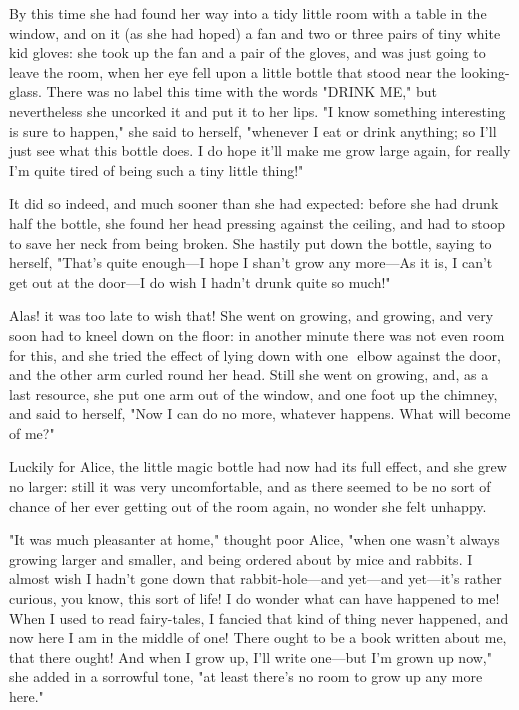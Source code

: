 By this time she had found her way into a tidy little room with a table in the window, and on it (as she had hoped) a fan and two or three pairs of tiny white kid gloves: she took up the fan and a pair of the gloves, and was just going to leave the room, when her eye fell upon a little bottle that stood near the looking-glass. There was no label this time with the ​words "DRINK ME," but nevertheless she uncorked it and put it to her lips. "I know something interesting is sure to happen," she said to herself, "whenever I eat or drink anything; so I'll just see what this bottle does. I do hope it'll make me grow large again, for really I'm quite tired of being such a tiny little thing!"

It did so indeed, and much sooner than she had expected: before she had drunk half the bottle, she found her head pressing against the ceiling, and had to stoop to save her neck from being broken. She hastily put down the bottle, saying to herself, "That's quite enough—I hope I shan't grow any more—As it is, I can't get out at the door—I do wish I hadn't drunk quite so much!"

Alas! it was too late to wish that! She went on growing, and growing, and very soon had to kneel down on the floor: in another minute there was not even room for this, and she tried the effect of lying down with one ​
elbow against the door, and the other arm curled round her head. Still she went on growing, and, as a last resource, she put one arm out of the window, and one foot up the chimney, and said to herself, "Now I can do no more, whatever happens. What will become of me?"

Luckily for Alice, the little magic bottle had now had its full effect, and she grew no larger: still it was very uncomfortable, and as there seemed to be no sort of chance of her ever ​getting out of the room again, no wonder she felt unhappy.

"It was much pleasanter at home," thought poor Alice, "when one wasn't always growing larger and smaller, and being ordered about by mice and rabbits. I almost wish I hadn't gone down that rabbit-hole—and yet—and yet—it's rather curious, you know, this sort of life! I do wonder what can have happened to me! When I used to read fairy-tales, I fancied that kind of thing never happened, and now here I am in the middle of one! There ought to be a book written about me, that there ought! And when I grow up, I'll write one—but I'm grown up now," she added in a sorrowful tone, "at least there's no room to grow up any more here."

